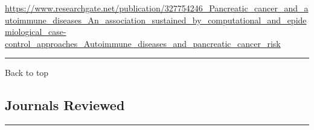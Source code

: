 \documentclass[]{article}
\begin{document}
\url{https://www.researchgate.net/publication/327754246_Pancreatic_cancer_and_autoimmune_diseases_An_association_sustained_by_computational_and_epidemiological_case-control_approaches_Autoimmune_diseases_and_pancreatic_cancer_risk}

\begin{center}\rule{0.5\linewidth}{\linethickness}\end{center}

Back to top

\pagebreak

\hypertarget{journals-reviewed}{%
\subsection{Journals Reviewed}\label{journals-reviewed}}

\begin{center}\rule{0.5\linewidth}{\linethickness}\end{center}
\end{document}
